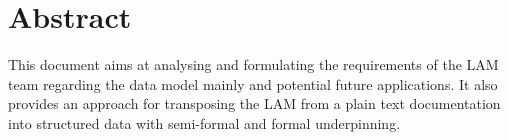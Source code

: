 \section*{Abstract}
This document aims at analysing and formulating the requirements of the
LAM team regarding the data model mainly and potential future
applications. It also provides an approach for transposing the LAM from
a plain text documentation into structured data with semi-formal and
formal underpinning.